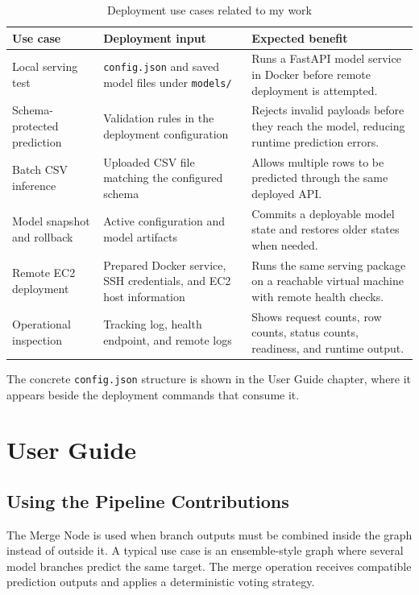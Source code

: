 \documentclass[12pt,a4paper,oneside]{report}
\newcommand{\modulepath}[1]{\texttt{#1}}
\begin{document}
\begin{table}[H]
\centering
\small
\caption{Deployment use cases related to my work}
\label{tab:deployment-use-cases-individual}
\begin{tabularx}{\textwidth}{p{}p{}X}
\toprule
\textbf{Use case} & \textbf{Deployment input} & \textbf{Expected benefit} \\
\midrule
Local serving test &
\modulepath{config.json} and saved model files under \modulepath{models/} &
Runs a FastAPI model service in Docker before remote deployment is attempted. \\
\midrule
Schema-protected prediction &
Validation rules in the deployment configuration &
Rejects invalid payloads before they reach the model, reducing runtime prediction errors. \\
\midrule
Batch CSV inference &
Uploaded CSV file matching the configured schema &
Allows multiple rows to be predicted through the same deployed API. \\
\midrule
Model snapshot and rollback &
Active configuration and model artifacts &
Commits a deployable model state and restores older states when needed. \\
\midrule
Remote EC2 deployment &
Prepared Docker service, SSH credentials, and EC2 host information &
Runs the same serving package on a reachable virtual machine with remote health checks. \\
\midrule
Operational inspection &
Tracking log, health endpoint, and remote logs &
Shows request counts, row counts, status counts, readiness, and runtime output. \\
\bottomrule
\end{tabularx}
\end{table}

\noindent The concrete \modulepath{config.json} structure is shown in the User Guide chapter, where it appears beside the deployment commands that consume it.

\chapter{User Guide}
\label{chap:individual-user-guide}

\section{Using the Pipeline Contributions}
The Merge Node is used when branch outputs must be combined inside the graph instead of outside it. A typical use case is an ensemble-style graph where several model branches predict the same target. The merge operation receives compatible prediction outputs and applies a deterministic voting strategy.
\end{document}

